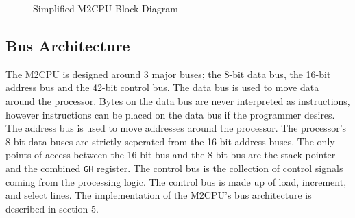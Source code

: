 \documentclass[a4paper,12pt]{article}
\newcommand{\mt}{M2CPU}
\newcommand{\ibusnum}{42}
\newcommand{\Gr}{\texttt{G}}
\newcommand{\Hr}{\texttt{H}}
\begin{document}
\newpage
\thispagestyle{empty}
\begin{landscape}
	\begin{figure}
	\caption{Simplified \mt{} Block Diagram}
	\end{figure}
\end{landscape}

\newpage
\subsection{Bus Architecture}
The \mt{} is designed around 3 major buses; the 8-bit data bus, the 16-bit 
address bus and the \ibusnum{}-bit control bus. The data bus is used to move 
data around the processor. Bytes on the data bus are never interpreted as 
instructions, however instructions can be placed on the data bus if the 
programmer desires. The address bus is used to move addresses around the 
processor. The processor's 8-bit data buses are strictly seperated from the 
16-bit address buses. The only points of access between the 16-bit bus and the 
8-bit bus are the stack pointer and the combined \Gr{}\Hr{} register. The 
control bus is the collection of control signals coming from the processing 
logic. The control bus is made up of load, increment, and select lines. The 
implementation of the \mt{}'s bus architecture is described in section 5.
\par
\end{document}
